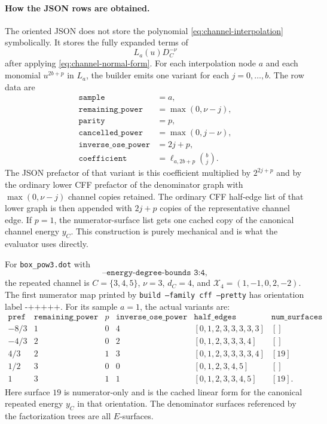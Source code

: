 \documentclass[11pt,a4paper]{report}
\newcommand{\Samples}{\mathcal X}
\begin{document}
\paragraph{How the JSON rows are obtained.}
The oriented JSON does not store the polynomial
\eqref{eq:channel-interpolation} symbolically.  It stores the fully expanded
terms of
\[
  L_a(u)D_C^{-\nu}
\]
after applying \eqref{eq:channel-normal-form}.  For each interpolation node
\(a\) and each monomial \(u^{2b+p}\) in \(L_a\), the builder emits one variant
for each \(j=0,\ldots,b\).  The row data are
\[
\begin{array}{rl}
\texttt{sample} &= a,\\
\texttt{remaining\_power} &= \max(0,\nu-j),\\
\texttt{parity} &= p,\\
\texttt{cancelled\_power} &= \max(0,j-\nu),\\
\texttt{inverse\_ose\_power} &= 2j+p,\\
\texttt{coefficient} &= \ell_{a,2b+p}\binom{b}{j}.
\end{array}
\]
The JSON prefactor of that variant is this coefficient multiplied by
\(2^{2j+p}\) and by the ordinary lower CFF prefactor of the denominator graph
with \(\max(0,\nu-j)\) channel copies retained.  The ordinary CFF half-edge
list of that lower graph is then appended with \(2j+p\) copies of the
representative channel edge.  If \(p=1\), the numerator-surface list gets one
cached copy of the canonical channel energy \(y_C\).  This construction is
purely mechanical and is what the evaluator uses directly.

For \texttt{box\_pow3.dot} with
\[
  \texttt{--energy-degree-bounds 3:4},
\]
the repeated channel is \(C=\{3,4,5\}\), \(\nu=3\), \(d_C=4\), and
\(\Samples_4=(1,-1,0,2,-2)\).  The first numerator map printed by
\texttt{build --family cff --pretty} has orientation label
\(\texttt{-+++++}\).  For its sample \(a=1\), the actual variants are:
\[
\begin{array}{c|c|c|c|c|c}
\texttt{pref} & \texttt{remaining\_power} & p &
\texttt{inverse\_ose\_power} & \texttt{half\_edges} &
\texttt{num\_surfaces}\\
\hline
-8/3 & 1 & 0 & 4 & [0,1,2,3,3,3,3,3] & []\\
-4/3 & 2 & 0 & 2 & [0,1,2,3,3,3,4] & []\\
 4/3 & 2 & 1 & 3 & [0,1,2,3,3,3,3,4] & [19]\\
 1/2 & 3 & 0 & 0 & [0,1,2,3,4,5] & []\\
 1   & 3 & 1 & 1 & [0,1,2,3,3,4,5] & [19].
\end{array}
\]
Here surface \(19\) is numerator-only and is the cached linear form for the
canonical repeated energy \(y_C\) in that orientation.  The denominator
surfaces referenced by the factorization trees are all \(E\)-surfaces.
\end{document}
